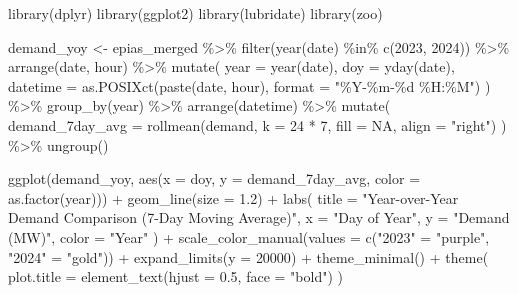 \documentclass[
]{article}
\newenvironment{Shaded}{\begin{snugshade}}{\end{snugshade}}
\newcommand{\AttributeTok}[1]{\textcolor[rgb]{0.40,0.45,0.13}{#1}}
\newcommand{\ConstantTok}[1]{\textcolor[rgb]{0.56,0.35,0.01}{#1}}
\newcommand{\DecValTok}[1]{\textcolor[rgb]{0.68,0.00,0.00}{#1}}
\newcommand{\FloatTok}[1]{\textcolor[rgb]{0.68,0.00,0.00}{#1}}
\newcommand{\FunctionTok}[1]{\textcolor[rgb]{0.28,0.35,0.67}{#1}}
\newcommand{\NormalTok}[1]{\textcolor[rgb]{0.00,0.23,0.31}{#1}}
\newcommand{\OtherTok}[1]{\textcolor[rgb]{0.00,0.23,0.31}{#1}}
\newcommand{\SpecialCharTok}[1]{\textcolor[rgb]{0.37,0.37,0.37}{#1}}
\newcommand{\StringTok}[1]{\textcolor[rgb]{0.13,0.47,0.30}{#1}}
\begin{document}
\begin{Shaded}
\begin{Highlighting}[]
\FunctionTok{library}\NormalTok{(dplyr)}
\FunctionTok{library}\NormalTok{(ggplot2)}
\FunctionTok{library}\NormalTok{(lubridate)}
\FunctionTok{library}\NormalTok{(zoo)}

\NormalTok{demand\_yoy }\OtherTok{\textless{}{-}}\NormalTok{ epias\_merged }\SpecialCharTok{\%\textgreater{}\%}
  \FunctionTok{filter}\NormalTok{(}\FunctionTok{year}\NormalTok{(date) }\SpecialCharTok{\%in\%} \FunctionTok{c}\NormalTok{(}\DecValTok{2023}\NormalTok{, }\DecValTok{2024}\NormalTok{)) }\SpecialCharTok{\%\textgreater{}\%}
  \FunctionTok{arrange}\NormalTok{(date, hour) }\SpecialCharTok{\%\textgreater{}\%}
  \FunctionTok{mutate}\NormalTok{(}
    \AttributeTok{year =} \FunctionTok{year}\NormalTok{(date),}
    \AttributeTok{doy =} \FunctionTok{yday}\NormalTok{(date),}
    \AttributeTok{datetime =} \FunctionTok{as.POSIXct}\NormalTok{(}\FunctionTok{paste}\NormalTok{(date, hour), }\AttributeTok{format =} \StringTok{"\%Y{-}\%m{-}\%d \%H:\%M"}\NormalTok{)}
\NormalTok{  ) }\SpecialCharTok{\%\textgreater{}\%}
  \FunctionTok{group\_by}\NormalTok{(year) }\SpecialCharTok{\%\textgreater{}\%}
  \FunctionTok{arrange}\NormalTok{(datetime) }\SpecialCharTok{\%\textgreater{}\%}
  \FunctionTok{mutate}\NormalTok{(}
    \AttributeTok{demand\_7day\_avg =} \FunctionTok{rollmean}\NormalTok{(demand, }\AttributeTok{k =} \DecValTok{24} \SpecialCharTok{*} \DecValTok{7}\NormalTok{, }\AttributeTok{fill =} \ConstantTok{NA}\NormalTok{, }\AttributeTok{align =} \StringTok{"right"}\NormalTok{)}
\NormalTok{  ) }\SpecialCharTok{\%\textgreater{}\%}
  \FunctionTok{ungroup}\NormalTok{()}

\FunctionTok{ggplot}\NormalTok{(demand\_yoy, }\FunctionTok{aes}\NormalTok{(}\AttributeTok{x =}\NormalTok{ doy, }\AttributeTok{y =}\NormalTok{ demand\_7day\_avg, }\AttributeTok{color =} \FunctionTok{as.factor}\NormalTok{(year))) }\SpecialCharTok{+}
  \FunctionTok{geom\_line}\NormalTok{(}\AttributeTok{size =} \FloatTok{1.2}\NormalTok{) }\SpecialCharTok{+}
  \FunctionTok{labs}\NormalTok{(}
    \AttributeTok{title =} \StringTok{"Year{-}over{-}Year Demand Comparison (7{-}Day Moving Average)"}\NormalTok{,}
    \AttributeTok{x =} \StringTok{"Day of Year"}\NormalTok{,}
    \AttributeTok{y =} \StringTok{"Demand (MW)"}\NormalTok{,}
    \AttributeTok{color =} \StringTok{"Year"}
\NormalTok{  ) }\SpecialCharTok{+}
  \FunctionTok{scale\_color\_manual}\NormalTok{(}\AttributeTok{values =} \FunctionTok{c}\NormalTok{(}\StringTok{"2023"} \OtherTok{=} \StringTok{"purple"}\NormalTok{, }\StringTok{"2024"} \OtherTok{=} \StringTok{"gold"}\NormalTok{)) }\SpecialCharTok{+}
  \FunctionTok{expand\_limits}\NormalTok{(}\AttributeTok{y =} \DecValTok{20000}\NormalTok{) }\SpecialCharTok{+}
  \FunctionTok{theme\_minimal}\NormalTok{() }\SpecialCharTok{+}
  \FunctionTok{theme}\NormalTok{(}
    \AttributeTok{plot.title =} \FunctionTok{element\_text}\NormalTok{(}\AttributeTok{hjust =} \FloatTok{0.5}\NormalTok{, }\AttributeTok{face =} \StringTok{"bold"}\NormalTok{)}
\NormalTok{  )}
\end{Highlighting}
\end{Shaded}
\end{document}
